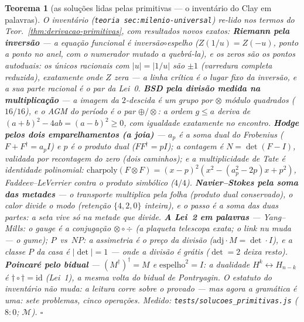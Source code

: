 \documentclass[11pt,a4paper]{article}
\newtheorem{teorema}{Teorema}
\newcommand{\code}[1]{\texttt{\small #1}}
\newcommand{\leitura}[1]{\code{#1}}
\begin{document}
\begin{teorema}[as soluções lidas pelas primitivas --- o inventário do
Clay em palavras]\label{thm:solucoes-primitivas}
O inventário (\leitura{teoria sec:milenio-universal}) re-lido nos termos do
Teor.~\ref{thm:derivacao-primitivas}, com resultados novos exatos:
\textbf{Riemann pela inversão} --- a equação funcional é
inversão$\circ$espelho ($Z(1/u)=Z(-u)$, ponto a ponto no anel, com o
numerador mutado a quebrá-la), e \emph{os zeros são os pontos
autoduais}: os únicos racionais com $|u|=|1/u|$ são $\pm1$
(varredura completa reduzida), exatamente onde $Z$ zera --- a linha
crítica é o lugar fixo da inversão, e a sua parte racional é o par da
Lei~0.
\textbf{BSD pela divisão medida na multiplicação} --- a imagem da
$2$-descida é um \emph{grupo} por $\otimes$ módulo quadrados
($16/16$), e o AGM do período é o par $\oplus/\otimes$: a ordem
$g\le a$ \emph{deriva} de $(a{+}b)^{2}-4ab=(a{-}b)^{2}\ge0$, com
igualdade exatamente no encontro.
\textbf{Hodge pelos dois emparelhamentos (a joia)} --- $a_{p}$ é a
\emph{soma dual} do Frobenius ($F+F^{\dagger}=a_{p}I$) e $p$ é o
\emph{produto dual} ($F F^{\dagger}=pI$); a contagem é
$\boxed{N=\det(F-I)}$, validada por recontagem do zero (dois
caminhos); e a multiplicidade de Tate é identidade polinomial:
$\mathrm{charpoly}(F{\otimes}F)=(x{-}p)^{2}(x^{2}-(a_{p}^{2}{-}2p)x+p^{2})$,
Faddeev--LeVerrier contra o produto simbólico ($4/4$).
\textbf{Navier--Stokes pela soma das metades} --- o transporte
\emph{multiplica} pela folha (produto dual conservado), o calor
\emph{divide} o modo (retenção $\{4,2,0\}$ inteira), e o passo é a
soma das duas partes: a seta vive só na metade que divide.
\textbf{A Lei~2 em palavras} --- Yang--Mills: o gauge é a conjugação
$\otimes\circ\div$ (a plaqueta telescopa exata; o link nu muda --- o
gume); $P$~vs~$NP$: a assimetria é \emph{o preço da divisão}
($\mathrm{adj}\cdot M=\det\cdot I$), e a classe $P$ da casa é
$|\det|=1$ --- onde a divisão é grátis ($\det=2$ deixa resto).
\textbf{Poincaré pelo bidual} --- $(M^{\dagger})^{\dagger}=M$ e
$\mathrm{espelho}^{2}=I$: a dualidade $H^{k}\leftrightarrow H_{n-k}$
é $\dagger\circ\dagger=\mathrm{id}$ (Lei~1), a mesma volta do bidual
de Pontryagin. O estatuto do inventário não muda: a leitura corre
sobre o provado --- mas agora \emph{a gramática é uma}: sete
problemas, cinco operações.
\emph{Medido:} \code{tests/solucoes\_primitivas.js} ($8{:}0$;
$\mathcal{M}$).
$\square$
\end{teorema}
\end{document}
